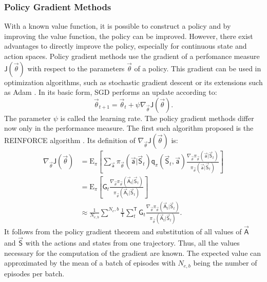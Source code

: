 \subsubsection{Policy Gradient Methods}
\label{sec:pgm}
With a known value function, it is possible to construct a policy and by improving the value function, the policy can be improved. However, there exist advantages to directly improve the policy, especially for continuous state and action spaces. Policy gradient methods use the gradient of a perfomance measure $\mathsf{J}(\vec{\theta})$ with respect to the parameters $\vec{\theta}$ of a policy. This gradient can be used in optimization algorithms, such as stochastic gradient descent \cite[p. 201]{sutton_reinforcement_2018} or its extensions such as Adam \cite{kingma_adam_2017}. In its basic form, SGD performs an update according to:
\begin{equation}
\vec{\theta}_{t+1} = \vec{\theta}_t + \psi \nabla_{\vec{\theta}} \mathsf{J}(\vec{\theta}). \label{eq:sgd}
\end{equation} 
The parameter $\psi$ is called the learning rate. The policy gradient methods differ now only in the performance measure. The first such algorithm proposed is the REINFORCE algorithm \cite{williams_simple_1992}. Its definition of $\nabla_{\vec{\theta}} \mathsf{J}(\vec{\theta})$ is:
\begin{align}
\nabla_{\vec{\theta}} \mathsf{J}(\vec{\theta}) 
&= \mathrm{E}_\pi \left[ \sum_{\vec{\mathsf{a}}} \pi_{\vec{\theta}} (\vec{\mathsf{a}}\vert \vec{\mathsf{S}}_t) \mathsf{q}_\pi(\vec{\mathsf{S}}_t, \vec{\mathsf{a}})
\frac{\nabla_{\vec{\theta}} \pi_{\vec{\theta}}(\vec{\mathsf{a}}\vert \vec{\mathsf{S}}_t)}{\pi_{\vec{\theta}}(\vec{\mathsf{a}}\vert \vec{\mathsf{S}}_t)} \right]\label{eq:reinforce} \\
&= \mathrm{E}_\pi \left[\mathsf{G}_t \frac{\nabla_{\vec{\theta}} \pi_{\vec{\theta}}(\vec{\mathsf{A}}_t\vert \vec{\mathsf{S}}_t)}{\pi_{\vec{\theta}}(\vec{\mathsf{A}}_t\vert \vec{\mathsf{S}}_t)} \right] \\
&\approx \frac{1}{N_{e,b}}\sum^{N_e,b} \frac{1}{\mathsf{T}}\sum_t^\mathsf{T} \mathsf{G}_t \frac{\nabla_{\vec{\theta}} \pi_{\vec{\theta}}(\vec{\mathsf{A}}_t\vert \vec{\mathsf{S}}_t)}{\pi_{\vec{\theta}}(\vec{\mathsf{A}}_t\vert \vec{\mathsf{S}}_t)}. 
\end{align} It follows from the policy gradient theorem and substitution of all values of $\vec{\mathsf{A}}$ and $\vec{\mathsf{S}}$ with the actions and states from one trajectory. Thus, all the values necessary for the computation of the gradient are known. The expected value can approximated by the mean of a batch of episodes with $N_{e,b}$ being the number of episodes per batch. \cite[p.324-328]{sutton_reinforcement_2018} \\
